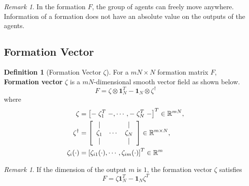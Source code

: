 \documentclass[11pt, a4paper, oneside, openany, reqno]{book}
\theoremstyle{definition}
\newtheorem{definition}[theorem]{Definition}
\theoremstyle{remark}
\newtheorem{remark}[theorem]{Remark}
\numberwithin{equation}{chapter} %
\newcommand{\R}{\ensuremath{{\mathbb R}}}
\newcommand{\ONE}{\textbf{1}}
\begin{document}
\begin{remark}
	In the formation $ F $, the group of agents can freely move anywhere.
	Information of a formation does not have an absolute value on the outputs of the agents.
\end{remark}


\subsection{Formation Vector}

\begin{definition}[Formation Vector $\zeta$]
	For a $ mN \times N $ formation matrix $ F $,
	\textbf{Formation vector} $ \zeta $ is a $ mN $-dimensional smooth vector field as shown below.
	\begin{equation}\label{fvec}
		F = \zeta \otimes \ONE_{N}^T   - \ONE_{N} \otimes \zeta^{\dag}
	\end{equation}	
	where 
	\begin{equation}\begin{split}\label{fvector}
		\zeta &= \left[ \relbar \zeta_1^T \relbar,\cdots,\relbar \zeta_N^T \relbar \right]^T \in \R^{mN}, \\
		\zeta^{\dag} &= \left[ \begin{array}{ccc } \vert & & \vert \\
		\zeta_1 & \cdots &\zeta_N \\	\vert & & \vert \\
		\end{array} \right] \in \R^{m \times N}, \\
		\zeta_i(\cdot) &= \left[ \zeta_{i1}(\cdot), \cdots , \zeta_{im}(\cdot)  \right]^T \in \R^m \\		
	\end{split}\end{equation}
\end{definition}

\begin{remark}
	If the dimension of the output $ m $ is $ 1 $, the formation vector $ \zeta $ satisfies
	\begin{equation}
		F = \zeta  \ONE_{N}^T   - \ONE_{N} \zeta^{T}
	\end{equation}
\end{remark}
\end{document}
